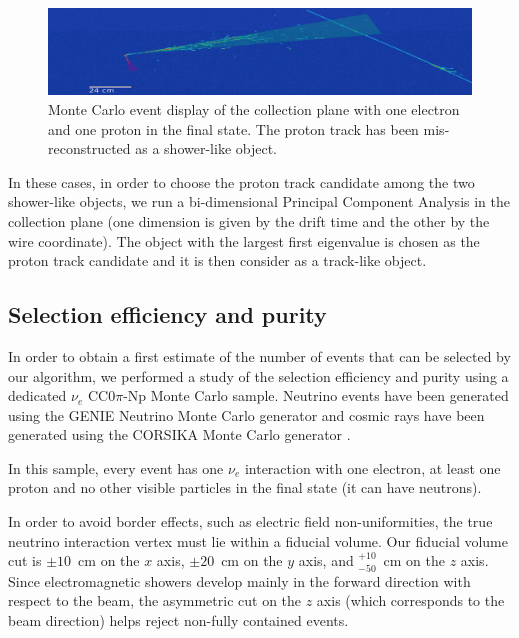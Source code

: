 \documentclass[a4paper]{article}
\begin{document}
\begin{figure}[htbp]
	\begin{center}
    	\includegraphics[width=0.8\linewidth]{figures/2showers.png}
    	\caption{Monte Carlo event display of the collection plane with one electron and one proton in the final state. The proton track has been mis-reconstructed as a shower-like object.} \label{fig:2showers}
	\end{center}
\end{figure}

In these cases, in order to choose the proton track candidate among the two shower-like objects, we run a bi-dimensional Principal Component Analysis in the collection plane (one dimension is given by the drift time and the other by the wire coordinate). The object with the largest first eigenvalue is chosen as the proton track candidate and it is then consider as a track-like object.

\subsection{Selection efficiency and purity}
In order to obtain a first estimate of the number of events that can be selected by our algorithm, we performed a study of the selection efficiency and purity using a dedicated $\nu_{e}$ CC$0\pi$-Np Monte Carlo sample. Neutrino events have been generated using the GENIE Neutrino Monte Carlo generator \cite{genie} and cosmic rays have been generated using the CORSIKA Monte Carlo generator \cite{corsika}. 

In this sample, every event has one $\nu_{e}$ interaction with one electron, at least one proton and no other visible particles in the final state (it can have neutrons). 

In order to avoid border effects, such as electric field non-uniformities, the true neutrino interaction vertex must lie within a fiducial volume. Our fiducial volume cut is $\pm10$~cm on the $x$ axis, $\pm20$~cm on the $y$ axis, and $^{+10}_{-50}$~cm on the $z$ axis. 
Since electromagnetic showers develop mainly in the forward direction with respect to the beam, the asymmetric cut on the $z$ axis (which corresponds to the beam direction) helps reject non-fully contained events.
\end{document}
